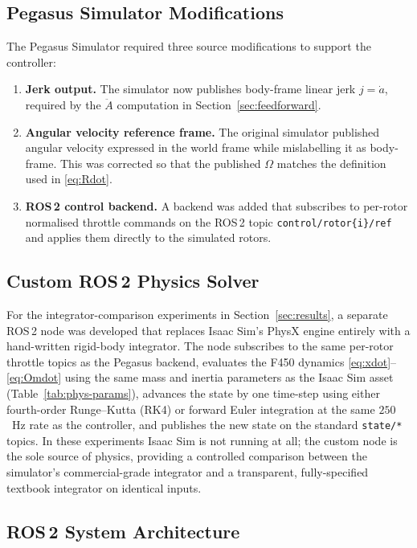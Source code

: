 \documentclass[11pt]{article}
\theoremstyle{remark}
\begin{document}
\subsection{Pegasus Simulator Modifications}
The Pegasus Simulator required three source modifications to support the controller:
\begin{enumerate}
    \item \textbf{Jerk output.} The simulator now publishes body-frame linear jerk $j = \dot a$, required by the $\ddot A$ computation in Section~\ref{sec:feedforward}.
    \item \textbf{Angular velocity reference frame.} The original simulator published angular velocity expressed in the world frame while mislabelling it as body-frame. This was corrected so that the published $\Omega$ matches the definition used in \eqref{eq:Rdot}.
    \item \textbf{ROS\,2 control backend.} A backend was added that subscribes to per-rotor normalised throttle commands on the ROS\,2 topic \texttt{control/rotor\{i\}/ref} and applies them directly to the simulated rotors.
\end{enumerate}

\subsection{Custom ROS\,2 Physics Solver}
\label{sec:custom-solver}
For the integrator-comparison experiments in Section~\ref{sec:results}, a separate ROS\,2 node was developed that replaces Isaac Sim's PhysX engine entirely with a hand-written rigid-body integrator. The node subscribes to the same per-rotor throttle topics as the Pegasus backend, evaluates the F450 dynamics \eqref{eq:xdot}--\eqref{eq:Omdot} using the same mass and inertia parameters as the Isaac Sim asset (Table~\ref{tab:phys-params}), advances the state by one time-step using either fourth-order Runge--Kutta (RK4) or forward Euler integration at the same $250$~Hz rate as the controller, and publishes the new state on the standard \texttt{state/*} topics. In these experiments Isaac Sim is not running at all; the custom node is the sole source of physics, providing a controlled comparison between the simulator's commercial-grade integrator and a transparent, fully-specified textbook integrator on identical inputs.

\subsection{ROS\,2 System Architecture}
\label{sec:ros2-architecture}
\end{document}
